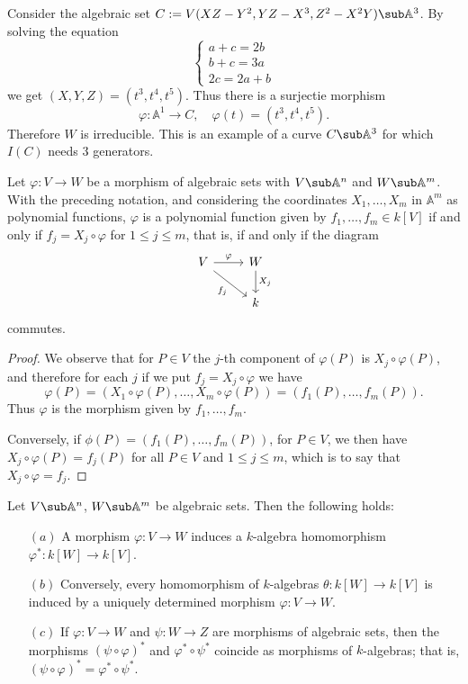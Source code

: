 \begin{example}
Consider the algebraic set $C:=V(XZ-Y^2,YZ-X^3,Z^2-X^2Y)\sub\mathbb{A}^3$. By solving the equation
\[\left\{\begin{array}{l}
a+c=2b\\
b+c=3a\\
2c=2a+b
\end{array}\right. \]
we get $(X,Y,Z)=(t^3,t^4,t^5)$. Thus there is a surjectie morphism
\[\varphi:\mathbb{A}^1\to C,\quad \varphi(t)=(t^3,t^4,t^5).\]
Therefore $W$ is irreducible. This is an example of a curve $C\sub\mathbb{A}^3$ for which $I(C)$ needs $3$ generators.
\end{example}
\begin{proposition}
Let $\varphi:V\to W$ be a morphism of algebraic sets with $V\sub\mathbb{A}^n$ and $W\sub\mathbb{A}^m$. With the preceding notation, and considering the coordinates $X_1,\dots,X_m$ in $\mathbb{A}^m$ as polynomial functions, $\varphi$ is a polynomial function given by $f_1,\dots,f_m\in k[V]$ if and only if $f_j=X_j\circ\varphi$ for $1\leq j\leq m$, that is, if and only if the diagram
\[\begin{tikzcd}
V\ar[r,"\varphi"]\ar[rd,swap,"f_j"]&W\ar[d,"X_j"]\\
&k
\end{tikzcd}\]
commutes.
\end{proposition}
\begin{proof}
We observe that for $P\in V$ the $j$-th component of $\varphi(P)$ is $X_j\circ\varphi(P)$, and therefore for each $j$ if we put $f_j=X_j\circ\varphi$ we have
\[\varphi(P)=(X_1\circ\varphi(P),\dots,X_m\circ\varphi(P))=(f_1(P),\dots,f_m(P)).\]
Thus $\varphi$ is the morphism given by $f_1,\dots,f_m$.\par
Conversely, if $\phi(P)=(f_1(P),\dots,f_m(P))$, for $P\in V$, we then have $X_j\circ\varphi(P)=f_j(P)$ for all $P\in V$ and $1\leq j\leq m$, which is to say that $X_j\circ\varphi=f_j$.
\end{proof}
\begin{theorem}\label{morphism coordinate ring}
Let $V\sub\mathbb{A}^n$, $W\sub\mathbb{A}^m$ be algebraic sets. Then the following holds:
\begin{itemize}
\item[$(a)$] A morphism $\varphi:V\to W$ induces a $k$-algebra homomorphism $\varphi^*:k[W]\to k[V]$.
\item[$(b)$] Conversely, every homomorphism of $k$-algebras $\theta:k[W]\to k[V]$ is induced by a uniquely determined morphism $\varphi:V\to W$.
\item[$(c)$] If $\varphi:V\to W$ and $\psi:W\to Z$ are morphisms of algebraic sets, then the morphisms $(\psi\circ\varphi)^*$ and $\varphi^*\circ\psi^*$ coincide as morphisms of $k$-algebras; that
is, $(\psi\circ\varphi)^*=\varphi^*\circ\psi^*$.
\end{itemize}
\end{theorem}
